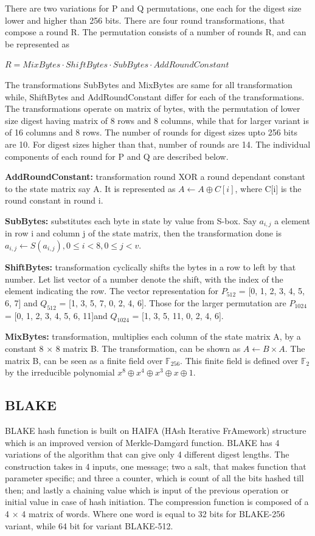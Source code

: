 \documentclass[12pt]{artikel3}                  %
\begin{document}
There are two variations for P and Q permutations, one each for the digest size lower and higher than 256 bits. There
are four round transformations, that compose a round R. The permutation consists of a number of rounds R, and can be
represented as 

$ R = MixBytes \cdot ShiftBytes \cdot SubBytes \cdot AddRoundConstant $

The transformations SubBytes and MixBytes are same for all transformation while, ShiftBytes and AddRoundConstant differ
for each of the transformations. The transformations operate on matrix of bytes, with the permutation of lower size
digest having matrix of 8 rows and 8 columns, while that for larger variant is of 16 columns and 8 rows. The number of
rounds for digest sizes upto 256 bits are 10. For digest sizes higher than that, number of rounds are 14. The individual
components of each round for P and Q are described below.

{\bf AddRoundConstant:} transformation round XOR a round dependant constant to the state matrix say A. It is 
represented as $A \gets A \oplus C[i]$, where C[i] is the round constant in round i.

{\bf SubBytes:} substitutes each byte in state by value from S-box. Say $a_{i,j}$ a element in row i and column j of 
the state matrix, then the transformation done is $a_{i,j} \gets S( a_{i,j}),  0 \leq i < 8, 0 \leq j < v.$

{\bf ShiftBytes:} transformation cyclically shifts the bytes in a row to left by that number. Let list vector 
of a number denote the shift, with the index of the element indicating the row. The vector representation for
$P_{512}$ = [0, 1, 2, 3, 4, 5, 6, 7] and $Q_{512}$ = [1, 3, 5, 7, 0, 2, 4, 6]. Those for the larger permutation 
are $P_{1024}$ = [0, 1, 2, 3, 4, 5, 6, 11]and $Q_{1024}$ = [1, 3, 5, 11, 0, 2, 4, 6].

{\bf MixBytes:} transformation, multiplies each column of the state matrix A, by a constant 8 $\times$ 8 matrix B.
The transformation, can be shown as $ A \gets B \times A$. The matrix B, can be seen as a finite field over 
$\mathbb{F}_{256}$. This finite field is defined over $\mathbb{F}_{2}$ by the irreducible polynomial 
$x^{8} \oplus x^{4} \oplus x^{3} \oplus x \oplus 1$.

\subsection{BLAKE}

BLAKE\cite{00002} hash function is built on HAIFA (HAsh Iterative FrAmework) structure \cite{00020} which is an improved
version of Merkle-Damg$\dot{a}$rd function. BLAKE has 4 variations of the algorithm that can give only 4 different digest
lengths. The construction takes in 4 inputs, one message; two a salt, that makes function that parameter specific; and
three a counter, which is count of all the bits hashed till then; and lastly a chaining value which is input of the previous
operation or initial value in case of hash initiation. The compression function is composed of a 4 $\times$ 4 matrix of words.
Where one word is equal to 32 bits for BLAKE-256 variant, while 64 bit for variant BLAKE-512.
\end{document}
